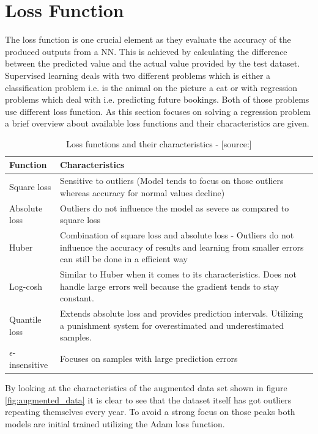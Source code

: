 \section{Loss Function}
\label{sec:loss_func}
The loss function is one crucial element as they evaluate the accuracy of the produced outputs from a NN. This is achieved by calculating the difference between the predicted value and the actual value provided by the test dataset. Supervised learning deals with two different problems which is either a classification problem i.e. is the animal on the picture a cat or with regression problems which deal with i.e. predicting future bookings. Both of those problems use different loss function.\cite{loss_func} As this section focuses on solving a regression problem a brief overview about available loss functions and their characteristics are given. 

\begin{table}[htbp]
	\centering
		\begin{tabularx}{\textwidth}{|l|X|}
		\hline
		\rowcolor[gray]{0.9}
		Function & Characteristics \\
		\hline
		Square loss &Sensitive to outliers (Model tends to focus on those outliers whereas accuracy for normal values decline)\\
		 \hline
		Absolute loss & Outliers do not influence the model as severe as compared to square loss  \\
		Huber & Combination of square loss and absolute loss - Outliers do not influence the accuracy of results and learning from smaller errors can still be done in a efficient way  \\
		\hline
		Log-cosh & Similar to Huber when it comes to its characteristics. Does not handle large errors well because the gradient tends to stay constant. \\
		\hline
		Quantile loss & Extends absolute loss and provides prediction intervals. Utilizing a punishment system for overestimated and underestimated samples. \\
		\hline
		$\epsilon$-insensitive & Focuses on samples with large prediction errors \\
		\hline	
		\end{tabularx}
	\label{tab:loss_function}
	\caption{Loss functions and their characteristics - [source:\cite{loss_func}]}
\end{table}

By looking at the characteristics of the augmented data set shown in figure \ref{fig:augmented_data} it is clear to see that the dataset itself has got outliers repeating themselves every year. To avoid a strong focus on those peaks both models are initial trained utilizing the Adam loss function.

